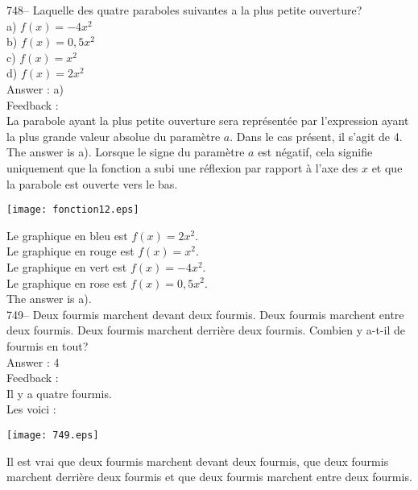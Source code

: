 \documentclass[letterpaper, 12pt]{article}
\begin{document}
748-- Laquelle des quatre paraboles suivantes a la plus petite ouverture?\\
a) $f(x)=-4x^{2}$\\
b) $f(x)=0,5x^{2}$\\
c) $f(x)=x^{2}$\\
d) $f(x)=2x^{2}$\\

Answer : a)\\

Feedback : \\
La parabole ayant la plus petite ouverture sera repr\'esent\'ee par
l'expression ayant la plus grande valeur absolue du param\`etre $a$. Dans le
cas pr\'esent, il s'agit de 4. The answer is a). Lorsque le signe du
param\`etre $a$ est n\'egatif, cela signifie uniquement que la fonction a
subi une r\'eflexion par rapport \`a l'axe des $x$ et que la parabole est
ouverte vers le bas.\\
    \begin{center}
    \texttt{[image: fonction12.eps]}
    \end{center}


Le graphique en bleu est $f(x)=2x^{2}$.\\
Le graphique en rouge est $f(x)=x^{2}$.\\
Le graphique en vert est $f(x)=-4x^{2}$.\\
Le graphique en rose est $f(x)=0,5x^{2}$.\\
The answer is a).\\


749-- Deux fourmis marchent devant deux fourmis.  Deux fourmis marchent
entre deux fourmis.  Deux fourmis marchent derri\`ere deux fourmis.  Combien
y a-t-il de fourmis en tout?\\


Answer : 4\\

Feedback :\\
Il y a quatre fourmis.\\
Les voici :\\
\begin{center}
\texttt{[image: 749.eps]}
\end{center}

Il est vrai que deux fourmis marchent devant deux fourmis, que deux fourmis
marchent derri\`ere deux fourmis et que deux fourmis marchent entre deux
fourmis. \\
\end{document}
